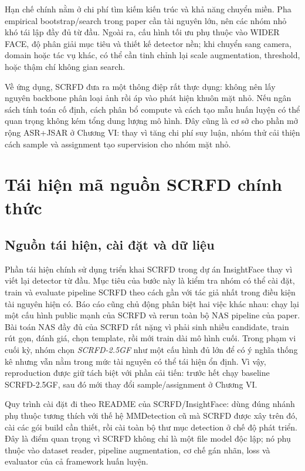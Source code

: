 Hạn chế chính nằm ở chi phí tìm kiếm kiến trúc và khả năng chuyển miền. Pha empirical bootstrap/search trong paper cần tài nguyên lớn, nên các nhóm nhỏ khó tái lập đầy đủ từ đầu. Ngoài ra, cấu hình tối ưu phụ thuộc vào WIDER FACE, độ phân giải mục tiêu và thiết kế detector nền; khi chuyển sang camera, domain hoặc tác vụ khác, có thể cần tinh chỉnh lại scale augmentation, threshold, hoặc thậm chí không gian search.

Về ứng dụng, SCRFD đưa ra một thông điệp rất thực dụng: không nên lấy nguyên backbone phân loại ảnh rồi áp vào phát hiện khuôn mặt nhỏ. Nếu ngân sách tính toán cố định, cách phân bổ compute và cách tạo mẫu huấn luyện có thể quan trọng không kém tổng dung lượng mô hình. Đây cũng là cơ sở cho phần mở rộng ASR+JSAR ở Chương VI: thay vì tăng chi phí suy luận, nhóm thử cải thiện cách sample và assignment tạo supervision cho nhóm mặt nhỏ.

\chapter{Tái hiện mã nguồn SCRFD chính thức}

\section{Nguồn tái hiện, cài đặt và dữ liệu}

Phần tái hiện chính sử dụng triển khai SCRFD trong dự án InsightFace thay vì viết lại detector từ đầu. Mục tiêu của bước này là kiểm tra nhóm có thể cài đặt, train và evaluate pipeline SCRFD theo cách gần với tác giả nhất trong điều kiện tài nguyên hiện có. Báo cáo cũng chủ động phân biệt hai việc khác nhau: chạy lại một cấu hình public mạnh của SCRFD và rerun toàn bộ NAS pipeline của paper. Bài toán NAS đầy đủ của SCRFD rất nặng vì phải sinh nhiều candidate, train rút gọn, đánh giá, chọn template, rồi mới train dài mô hình cuối. Trong phạm vi cuối kỳ, nhóm chọn \textit{SCRFD-2.5GF} như một cấu hình đủ lớn để có ý nghĩa thống kê nhưng vẫn nằm trong mức tài nguyên có thể tái hiện ổn định. Vì vậy, reproduction được giữ tách biệt với phần cải tiến: trước hết chạy baseline SCRFD-2.5GF, sau đó mới thay đổi sample/assignment ở Chương VI.

Quy trình cài đặt đi theo README của SCRFD/InsightFace: dùng đúng nhánh phụ thuộc tương thích với thế hệ MMDetection cũ mà SCRFD được xây trên đó, cài các gói build cần thiết, rồi cài toàn bộ thư mục detection ở chế độ phát triển. Đây là điểm quan trọng vì SCRFD không chỉ là một file model độc lập; nó phụ thuộc vào dataset reader, pipeline augmentation, cơ chế gán nhãn, loss và evaluator của cả framework huấn luyện.

